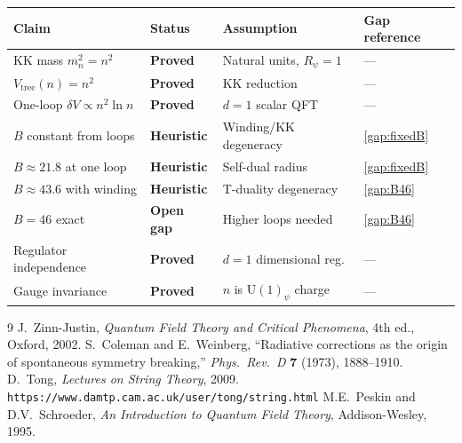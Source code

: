 \documentclass[11pt,a4paper]{article}
\begin{document}
\begin{center}
\begin{tabular}{llll}
\hline
Claim & Status & Assumption & Gap reference \\
\hline
KK mass $m_n^2 = n^2$ & \textbf{Proved} & Natural units, $R_\psi = 1$ & --- \\
$V_\mathrm{tree}(n) = n^2$ & \textbf{Proved} & KK reduction & --- \\
One-loop $\delta V \propto n^2\ln n$ & \textbf{Proved} & $d=1$ scalar QFT & --- \\
$B$ constant from loops & \textbf{Heuristic} & Winding/KK degeneracy & \ref{gap:fixedB} \\
$B \approx 21.8$ at one loop & \textbf{Heuristic} & Self-dual radius & \ref{gap:fixedB} \\
$B \approx 43.6$ with winding & \textbf{Heuristic} & T-duality degeneracy & \ref{gap:B46} \\
$B = 46$ exact & \textbf{Open gap} & Higher loops needed & \ref{gap:B46} \\
Regulator independence & \textbf{Proved} & $d=1$ dimensional reg. & --- \\
Gauge invariance & \textbf{Proved} & $n$ is $\mathrm{U}(1)_\psi$ charge & --- \\
\hline
\end{tabular}
\end{center}

\begin{thebibliography}{9}
 J.\ Zinn-Justin, \emph{Quantum Field Theory and Critical
  Phenomena}, 4th ed., Oxford, 2002.
 S.\ Coleman and E.\ Weinberg, ``Radiative corrections as the
  origin of spontaneous symmetry breaking,'' \emph{Phys.\ Rev.\ D} \textbf{7}
  (1973), 1888--1910.
 D.\ Tong, \emph{Lectures on String Theory}, 2009.
  \texttt{https://www.damtp.cam.ac.uk/user/tong/string.html}
 M.E.\ Peskin and D.V.\ Schroeder, \emph{An Introduction to
  Quantum Field Theory}, Addison-Wesley, 1995.
\end{thebibliography}
\end{document}
